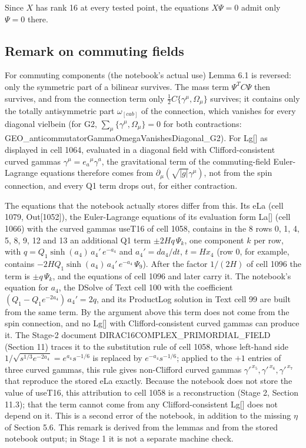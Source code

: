 \documentclass[11pt]{article}
\begin{document}
Since $X$ has rank 16 at every tested point, the equations $X\Psi=0$ admit only $\Psi=0$ there.

\subsection{Remark on commuting fields}

For commuting components (the notebook's actual use) Lemma 6.1 is reversed: only the symmetric part of a bilinear survives. The mass term $\Psi^TC\Psi$ then survives, and from the connection term only $\tfrac12C\{\gamma^\mu,\Omega_\mu\}$ survives; it contains only the totally antisymmetric part $\omega_{[cab]}$ of the connection, which vanishes for every diagonal vielbein (for G2, $\sum_\mu\{\gamma^\mu,\Omega_\mu\}=0$ for both contractions: GEO\_anticommutatorGammaOmegaVanishesDiagonal\_G2). For Lg[] as displayed in cell 1064, evaluated in a diagonal field with Clifford-consistent curved gammas $\gamma^\mu=e_a{}^\mu\gamma^a$, the gravitational term of the commuting-field Euler-Lagrange equations therefore comes from $\partial_\mu(\sqrt{|g|}\gamma^\mu)$, not from the spin connection, and every Q1 term drops out, for either contraction.

The equations that the notebook actually stores differ from this. Its eLa (cell 1079, Out[1052]), the Euler-Lagrange equations of its evaluation form La[] (cell 1066) with the curved gammas useT16 of cell 1058, contains in the 8 rows 0, 1, 4, 5, 8, 9, 12 and 13 an additional Q1 term $\pm2Hq\,\Psi_k$, one component $k$ per row, with $q=Q_1\sinh(a_4)\,a_4'\,e^{-a_4}$ and $a_4'=da_4/dt$, $t=Hx_4$ (row 0, for example, contains $-2HQ_1\sinh(a_4)\,a_4'\,e^{-a_4}\,\Psi_9$). After the factor $1/(2H)$ of cell 1096 the term is $\pm q\,\Psi_k$, and the equations of cell 1096 and later carry it. The notebook's equation for $a_4$, the DSolve of Text cell 100 with the coefficient $(Q_1-Q_1e^{-2a_4})\,a_4'=2q$, and its ProductLog solution in Text cell 99 are built from the same term. By the argument above this term does not come from the spin connection, and no Lg[] with Clifford-consistent curved gammas can produce it. The Stage-2 document DIRAC16COMPLEX\_PRIMORDIAL\_FIELD (Section 11) traces it to the substitution rule of cell 1058, whose left-hand side $1/\sqrt{s^{1/3}e^{-2a_4}}=e^{a_4}s^{-1/6}$ is replaced by $e^{-a_4}s^{-1/6}$; applied to the $+1$ entries of three curved gammas, this rule gives non-Clifford curved gammas $\gamma'^{\,x_5},\gamma'^{\,x_6},\gamma'^{\,x_7}$ that reproduce the stored eLa exactly. Because the notebook does not store the value of useT16, this attribution to cell 1058 is a reconstruction (Stage 2, Section 11.3); that the term cannot come from any Clifford-consistent Lg[] does not depend on it. This is a second error of the notebook, in addition to the missing $\eta$ of Section 5.6. This remark is derived from the lemmas and from the stored notebook output; in Stage 1 it is not a separate machine check.
\end{document}
